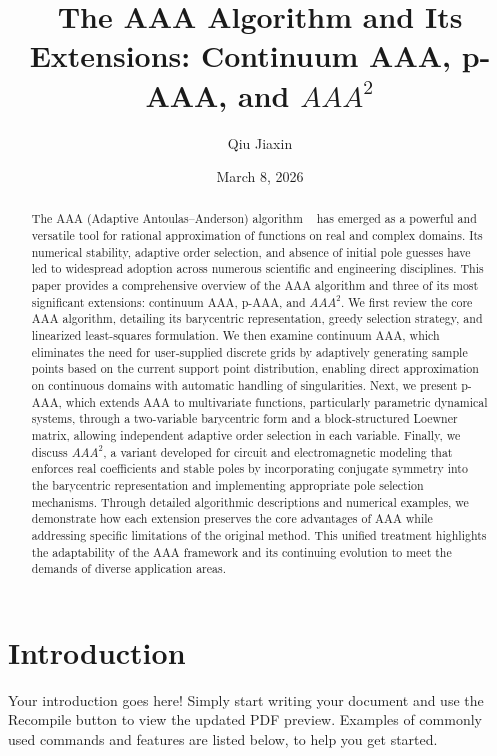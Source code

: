 \documentclass{article}
\title{The AAA Algorithm and Its Extensions: Continuum AAA, p-AAA, and $AAA^2$}
\author{Qiu Jiaxin}
\date{March 8, 2026}
\begin{document}
\maketitle
\begin{abstract}
The AAA (Adaptive Antoulas–Anderson) algorithm ~\cite{ref1} has emerged as a powerful and versatile tool for rational approximation of functions on real and complex domains. Its numerical stability, adaptive order selection, and absence of initial pole guesses have led to widespread adoption across numerous scientific and engineering disciplines. This paper provides a comprehensive overview of the AAA algorithm and three of its most significant extensions: continuum AAA, p-AAA, and $AAA^{2}$. We first review the core AAA algorithm, detailing its barycentric representation, greedy selection strategy, and linearized least-squares formulation. We then examine continuum AAA, which eliminates the need for user-supplied discrete grids by adaptively generating sample points based on the current support point distribution, enabling direct approximation on continuous domains with automatic handling of singularities. Next, we present p-AAA, which extends AAA to multivariate functions, particularly parametric dynamical systems, through a two-variable barycentric form and a block-structured Loewner matrix, allowing independent adaptive order selection in each variable. Finally, we discuss $AAA^{2}$, a variant developed for circuit and electromagnetic modeling that enforces real coefficients and stable poles by incorporating conjugate symmetry into the barycentric representation and implementing appropriate pole selection mechanisms. Through detailed algorithmic descriptions and numerical examples, we demonstrate how each extension preserves the core advantages of AAA while addressing specific limitations of the original method. This unified treatment highlights the adaptability of the AAA framework and its continuing evolution to meet the demands of diverse application areas.
\end{abstract}

\newpage

\tableofcontents

\newpage

\section{Introduction}

Your introduction goes here! Simply start writing your document and use the Recompile button to view the updated PDF preview. Examples of commonly used commands and features are listed below, to help you get started.
\end{document}
